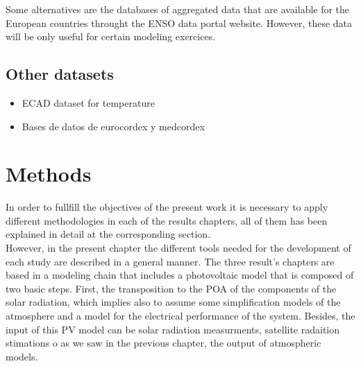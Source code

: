 Some alternatives are the databases of aggregated data that are available for the European countries throught the ENSO data portal website. However, these data will be only useful for certain modeling exercices.

\section{Other datasets}

\begin{itemize}
\item ECAD dataset for temperature
\item Bases de datos de eurocordex y medcordex
\end{itemize}

\chapter{Methods\label{cha:methods}}

In order to fullfill the objectives of the present work it is necessary to apply different methodologies in each of the results chapters, all of them has been explained in detail at the corresponding section.\\ %

However, in the present chapter the different tools needed for the development of each study are described in a general manner. The three result's chapters are based in a modeling chain that includes a photovoltaic model that is composed of two basic steps. First, the transposition to the POA of the components of the solar radiation, which implies also to assume some simplification models of the atmosphere and a model for the electrical performance of the system. Besides, the input of this PV model can be solar radiation measurments, satellite radaition stimations o as we saw in the previous chapter, the output of atmospheric models. \\

